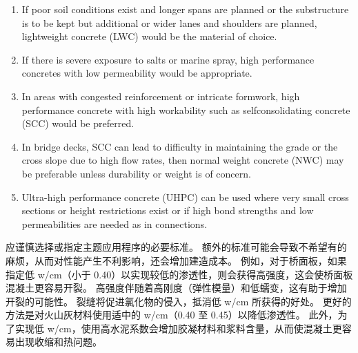 \begin{enumerate}
  \item If poor soil conditions exist and longer spans are planned or the substructure is to be kept but additional or wider lanes and shoulders are planned, lightweight concrete (LWC) would be the material of choice.
  \item If there is severe exposure to salts or marine spray, high performance concretes with low permeability would be appropriate.
  \item In areas with congested reinforcement or intricate formwork, high performance concrete with high workability such as selfconsolidating  concrete (SCC) would be preferred. 
  \item In bridge decks, SCC can lead to difficulty in maintaining the grade or the cross slope due to high flow rates, then normal weight concrete (NWC) may be preferable unless durability or weight is of concern.
  \item Ultra-high performance concrete (UHPC) can be used where very small cross sections or height restrictions exist or if high bond strengths and low permeabilities are needed as in connections.
\end{enumerate}

应谨慎选择或指定主题应用程序的必要标准。 额外的标准可能会导致不希望有的麻烦，从而对性能产生不利影响，还会增加建造成本。 例如，对于桥面板，如果指定低 w/cm（小于 0.40）以实现较低的渗透性，则会获得高强度，这会使桥面板混凝土更容易开裂。 高强度伴随着高刚度（弹性模量）和低蠕变，这有助于增加开裂的可能性。 裂缝将促进氯化物的侵入，抵消低 w/cm 所获得的好处。 更好的方法是对火山灰材料使用适中的 w/cm（0.40 至 0.45）以降低渗透性。 此外，为了实现低 w/cm，使用高水泥系数会增加胶凝材料和浆料含量，从而使混凝土更容易出现收缩和热问题。

